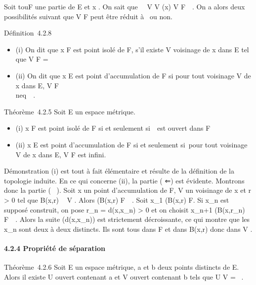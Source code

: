 \documentclass[]{article}
\begin{document}
Soit tou\jmathours F une partie de E et x \in\overlineF. On
sait que \forall~~V \in V (x) V \bigcap
F\neq~\varnothing~. On a alors deux possibilités suivant que
V \bigcap F peut être réduit à \x\ ou non.

Définition~4.2.8

\begin{itemize}
\itemsep1pt\parskip0pt
\item
  (i) On dit que x \in F est point isolé de F, s'il existe V voisinage de
  x dans E tel que V \bigcap F = \x\
\item
  (ii) On dit que x \in E est point d'accumulation de F si pour tout
  voisinage V de x dans E, V \bigcap F
  \diagdown\x\\neq~\varnothing~.
\end{itemize}

Théorème~4.2.5 Soit E un espace métrique.

\begin{itemize}
\itemsep1pt\parskip0pt
\item
  (i) x \in F est point isolé de F si et seulement
  si~\x\ est ouvert dans F
\item
  (ii) x \in E est point d'accumulation de F si et seulement si~pour tout
  voisinage V de x dans E, V \bigcap F est infini.
\end{itemize}

Démonstration (i) est tout à fait élémentaire et résulte de la
définition de la topologie induite. En ce qui concerne (ii), la partie (
⇐) est évidente. Montrons donc la partie ( \rigtharrow~). Soit x un point
d'accumulation de F, V un voisinage de x et r \textgreater{} 0 tel que
B(x,r) \subset~ V . Alors (B(x,r) \diagdown\x\) \bigcap
F\neq~\varnothing~. Soit x\_1 \in (B(x,r)
\diagdown\x\) \bigcap F. Si x\_n est supposé
construit, on pose r\_n = d(x,x\_n) \textgreater{} 0 et
on choisit x\_n+1 \in (B(x,r\_n)
\diagdown\x\) \bigcap
F\neq~\varnothing~. Alors la suite (d(x,x\_n)) est
strictement décroissante, ce qui montre que les x\_n sont deux à
deux distincts. Ils sont tous dans F et dans B(x,r) donc dans V .

\paragraph{4.2.4 Propriété de séparation}

Théorème~4.2.6 Soit E un espace métrique, a et b deux points distincts
de E. Alors il existe U ouvert contenant a et V ouvert contenant b tels
que U \bigcap V = \varnothing~.
\end{document}
